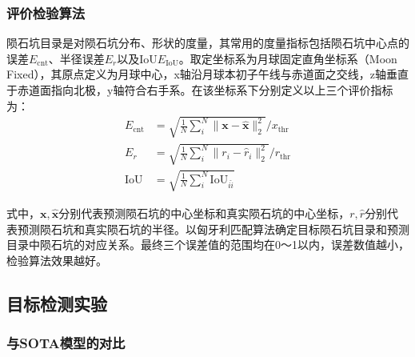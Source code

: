 \subsubsection{评价检验算法}
陨石坑目录是对陨石坑分布、形状的度量，其常用的度量指标包括陨石坑中心点的误差$E_\mathrm{cnt}$、半径误差$E_r$以及IoU$E_\mathrm{IoU}$\cite{liuIdentificationLunarCraters2024}。取定坐标系为月球固定直角坐标系（Moon Fixed），其原点定义为月球中心，x轴沿月球本初子午线与赤道面之交线，z轴垂直于赤道面指向北极，y轴符合右手系。在该坐标系下分别定义以上三个评价指标为：
\begin{align}
  E_\mathrm{cnt}&=\sqrt{\frac{1}{N}\sum_i^N\|\mathbf{x}-\hat{\mathbf{x}}\|_2^2}/x_\mathrm{thr}\\
  E_r&=\sqrt{\frac{1}{N}\sum_i^N\|r_i-\hat{r}_i\|_2^2}/r_\mathrm{thr}\\
  \mathrm{IoU}&=\sqrt{\frac{1}{N}\sum_i^N\mathrm{IoU}_{i\hat{i}}}
\end{align}\par
式中，$\mathbf{x},\hat{\mathbf{x}}$分别代表预测陨石坑的中心坐标和真实陨石坑的中心坐标，$r,\hat{r}$分别代表预测陨石坑和真实陨石坑的半径。以匈牙利匹配算法确定目标陨石坑目录和预测目录中陨石坑的对应关系。最终三个误差值的范围均在0～1以内，误差数值越小，检验算法效果越好。
\subsection{目标检测实验}
\subsubsection{与SOTA模型的对比}

